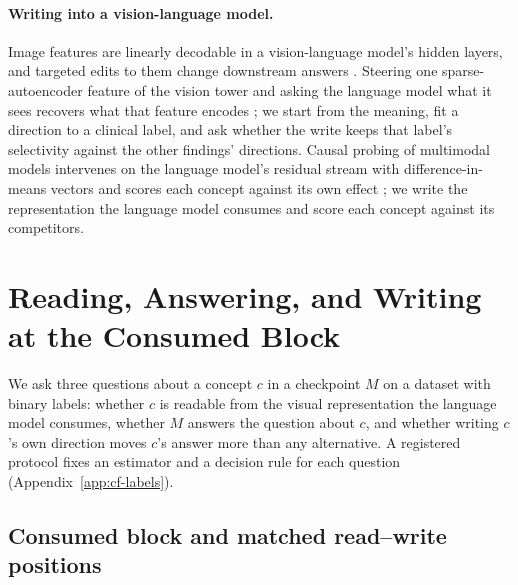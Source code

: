 \documentclass{article}
\begin{document}
\paragraph{Writing into a vision-language model.}
Image features are linearly decodable in a vision-language model's hidden layers, and targeted edits to them change downstream answers \citep{rajaram2025lineofsight}. Steering one sparse-autoencoder feature of the vision tower and asking the language model what it sees recovers what that feature encodes \citep{ferrando2026explain}; we start from the meaning, fit a direction to a clinical label, and ask whether the write keeps that label's selectivity against the other findings' directions. Causal probing of multimodal models intervenes on the language model's residual stream with difference-in-means vectors and scores each concept against its own effect \citep{deng2026causal}; we write the representation the language model consumes and score each concept against its competitors.

\section{Reading, Answering, and Writing at the Consumed Block}
\label{sec:framework}

We ask three questions about a concept $c$ in a checkpoint $M$ on a dataset with binary labels: whether $c$ is readable from the visual representation the language model consumes, whether $M$ answers the question about $c$, and whether writing $c$'s own direction moves $c$'s answer more than any alternative. A registered protocol fixes an estimator and a decision rule for each question (Appendix~\ref{app:cf-labels}).

\subsection{Consumed block and matched read--write positions}
\label{sec:locus}
\end{document}
